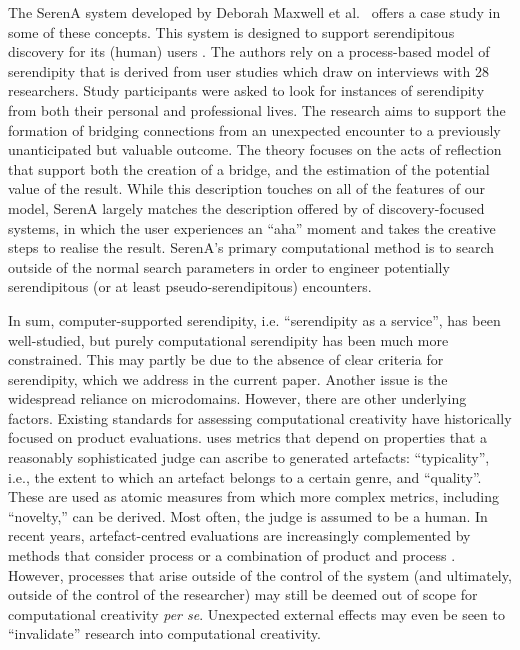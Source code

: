 The {\sf SerenA} system developed by Deborah Maxwell et
al.~\cite{maxwell2012designing} offers a case study in some
of these concepts.  This system is designed to support
serendipitous discovery for its (human) users
\cite{forth2013serena}.  The authors rely on a process-based
model of serendipity \cite{Makri2012,Makri2012a} that is derived
from user studies which draw on interviews with 28 researchers.
Study participants  were asked to look for instances of
serendipity from both
their personal and professional lives.  The research aims to
support the formation of bridging connections from an unexpected
encounter to a previously unanticipated but valuable outcome.
The theory focuses on the acts of reflection that support both
the creation of a bridge, and the estimation of the potential
value of the result.
%
While this description touches on all of the features of our model, {\sf
  SerenA} largely matches the description offered by \citet{andre2009discovery} of discovery-focused systems, in which
the user experiences an ``aha'' moment and takes the
creative steps to realise the result.  {\sf SerenA}'s primary computational method is to
search outside of the normal search parameters in order to engineer
potentially serendipitous (or at least pseudo-serendipitous)
encounters.

In sum, computer-supported serendipity, i.e. ``serendipity as a service'', has been well-studied, but purely computational serendipity has been much more constrained.
This may partly be
due to the absence of clear criteria for serendipity, which we address
in the current paper.  Another issue is the widespread reliance on microdomains.  However, there are other underlying factors.
Existing standards for assessing computational creativity have
historically focused on product evaluations.
 uses metrics that depend on properties that a reasonably sophisticated judge can ascribe to generated artefacts:  ``typicality'', i.e., the extent to which an artefact belongs to a certain genre, and ``quality''.  These are used as atomic measures from which more complex metrics, including ``novelty,'' can be derived.  Most often, the judge is assumed to be a human.
%
In recent years, artefact-centred evaluations are increasingly
complemented by methods that consider process
\cite{colton2008creativity} or a combination of product and process
\cite{jordanous:12,colton-assessingprogress}.  However, processes that
arise outside of the control of the system (and ultimately, outside of
the control of the researcher) may still be deemed out of scope for
computational creativity \emph{per se}.  Unexpected external effects
may even be seen to ``invalidate'' research into computational
creativity.

